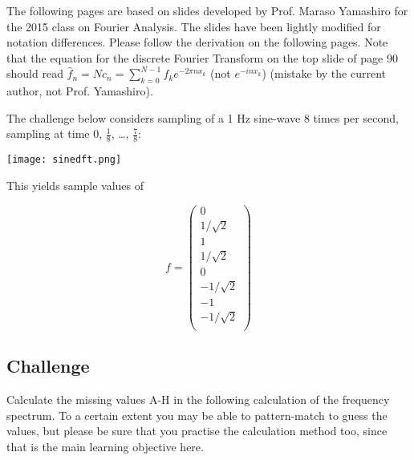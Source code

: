 The following pages are based on slides developed by Prof. Maraso Yamashiro for the 2015 class on Fourier Analysis. The slides have been lightly modified for notation differences. Please follow the derivation on the following pages. Note that the equation for the discrete Fourier Transform on the top slide of page 90 should read $\hat{f}_n = N c_n = \sum_{k=0}^{N-1} f_k e^{-2 \pi n x_k}$ (not $e^{-inx_k}$) (mistake by the current author, not Prof. Yamashiro).



The challenge below considers sampling of a 1 Hz sine-wave 8 times per second, sampling at time 0, $\frac{1}{8}$, \ldots, $\frac{7}{8}$:

\texttt{[image: sinedft.png]}

This yields sample values of

\begin{equation}
f = \left(
\begin{array}{c}
 0 \\
 1/\sqrt{2} \\
 1 \\
 1/\sqrt{2} \\
 0 \\
 -1/\sqrt{2} \\
 -1 \\
 -1/\sqrt{2} \\
\end{array}
\right)
\end{equation}

\subsection*{Challenge}
Calculate the missing values A-H in the following calculation of the frequency spectrum. To a certain extent you may be able to pattern-match to guess the values, but please be sure that you practise the calculation method too, since that is the main learning objective here.


